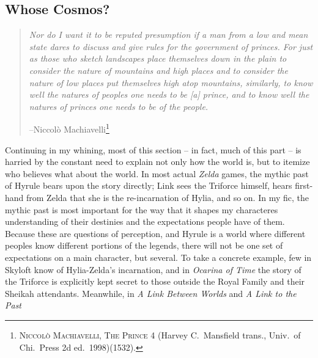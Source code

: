 \documentclass[../FGP.tex]{subfiles}
\begin{document}
\subsection{Whose Cosmos?}
  \begin{quote}
  \textit{Nor do I want it to be reputed presumption if a man from a low and mean state dares to discuss and give rules for the government of princes. For just as those who sketch landscapes place themselves down in the plain to consider the nature of mountains and high places and to consider the nature of low places put themselves high atop mountains, similarly, to know well the natures of peoples one needs to be [a] prince, and to know well the natures of princes one needs to be of the people.}

  \hfill--Niccolò Machiavelli\footnote{\label{note:prince}\textsc{Niccolò Machiavelli, The Prince} 4 (Harvey C.~Mansfield trans., Univ.~of Chi.~Press 2d ed.~1998)(1532).}
  \end{quote}
Continuing in my whining, most of this section -- in fact, much of this part -- is harried by the constant need to explain not only how the world is, but to itemize who believes what about the world. 
In most actual \emph{Zelda} games, the mythic past of Hyrule bears upon the story directly; Link sees the Triforce himself, hears first-hand from Zelda that she is the re-incarnation of Hylia, and so on. In my fic, the mythic past is most important for the way that it shapes my characteres understanding of their destinies and the expectations people have of them. Because these are questions of perception, and Hyrule is a world where different peoples know different portions of the legends, there will not be one set of expectations on a main character, but several. To take a concrete example, few in Skyloft know of Hylia-Zelda's incarnation, and in \emph{Ocarina of Time}
the story of the Triforce is explicitly kept secret to those outside the Royal Family and their Sheikah attendants. Meanwhile, in \emph{A Link Between Worlds}
and \emph{A Link to the Past}
\end{document}
